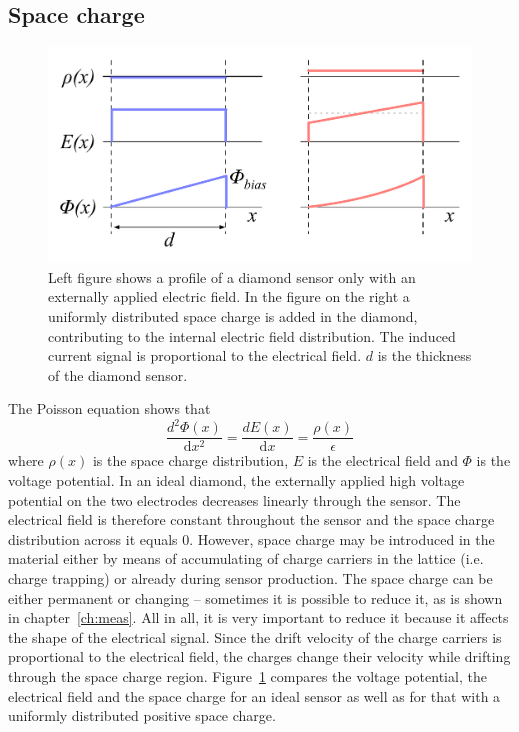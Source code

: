 \subsection{Space charge}
\begin{figure}[!t]
\begin{center}
\includegraphics[width=0.6\linewidth]{02_pulse_formation/pics/plots/spcchg}
\caption{Left figure shows a profile of a diamond sensor only with an externally applied electric field. In the figure on the right a uniformly distributed space charge is added in the diamond, contributing to  the internal electric field distribution. The induced current signal is proportional to the electrical field. $d$ is the thickness of the diamond sensor.}
\label{fig:spcchg}
\end{center}
\end{figure}
The Poisson equation shows that 
\begin{equation}
\label{eq:poisson}
\frac{d^2\Phi(x)}{\mathrm{d}x^2} = \frac{dE(x)}{\mathrm{d}x} = \frac{\rho(x)}{\epsilon}
\end{equation}
where $\rho(x)$ is the space charge distribution, $E$ is the electrical field and $\Phi$ is the voltage potential. In an ideal diamond, the externally applied high voltage potential on the two electrodes decreases linearly through the sensor. The electrical field is therefore constant throughout the sensor and the space charge distribution across it equals 0. However, space charge may be introduced in the material either by means of accumulating of charge carriers in the lattice (i.e. charge trapping) or already during sensor production. The space charge can be either permanent or changing -- sometimes it is possible to reduce it, as is shown in chapter~\ref{ch:meas}. All in all, it is very important to reduce it because it affects the shape of the electrical signal. Since the drift velocity of the charge carriers is proportional to the electrical field, the charges change their velocity while drifting through the space charge region. Figure~\ref{fig:spcchg} compares the voltage potential, the electrical field and the space charge for an ideal sensor as well as for that with a uniformly distributed positive space charge.




